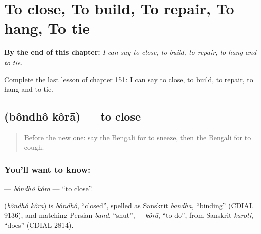 
\chapter{To close, To build, To repair, To hang, To tie}
\label{ch:bn-to-close-to-build-to-repair-to-hang-to-tie}

\begin{chapteropening}
\textbf{By the end of this chapter:} \emph{I can say to close, to build, to repair, to hang and to tie.}

Complete the last lesson of chapter 151: I can say to close, to build, to repair, to hang and to tie.
\end{chapteropening}

\section[\texorpdfstring{\bn{বন্ধ} \bn{করা} (bôndhô kôrā)}{বন্ধ করা (bôndhô kôrā)}]{  (bôndhô kôrā) — to close}

\label{lesson:BN-C151-bondho-kora}



\begin{quote}
Before the new one: say the Bengali for to sneeze, then the Bengali for to cough.
\end{quote}

\subsection*{You'll want to know:  }
\textbf{ } — \emph{bôndhô kôrā} — \textquotedblleft{}to close\textquotedblright{}.

\begin{cousinweb}
\textbf{ } (\emph{bôndhô kôrā}) is \emph{bôndhô}, \textquotedblleft{}closed\textquotedblright{}, spelled as Sanskrit \emph{bandha}, \textquotedblleft{}binding\textquotedblright{} (CDIAL 9136), and matching Persian \emph{band}, \textquotedblleft{}shut\textquotedblright{}, + \emph{kôrā}, \textquotedblleft{}to do\textquotedblright{}, from Sanskrit \emph{karoti}, \textquotedblleft{}does\textquotedblright{} (CDIAL 2814).
\end{cousinweb}


